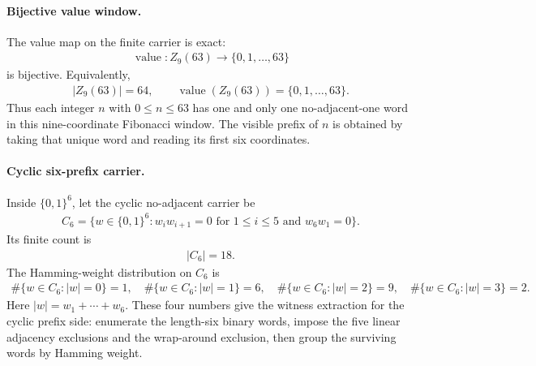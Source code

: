 \paragraph{Bijective value window.}
The value map on the finite carrier is exact:
$$
\begin{aligned}
\operatorname{value}:Z_9(63)\longrightarrow \{0,1,\ldots,63\}
\end{aligned}
$$
is bijective. Equivalently,
$$
\begin{aligned}
|Z_9(63)|=64,\qquad \operatorname{value}(Z_9(63))=\{0,1,\ldots,63\}.
\end{aligned}
$$
Thus each integer $n$ with $0\leq n\leq 63$ has one and only one no-adjacent-one word in this nine-coordinate Fibonacci window. The visible prefix of $n$ is obtained by taking that unique word and reading its first six coordinates.

\paragraph{Cyclic six-prefix carrier.}
Inside $\{0,1\}^6$, let the cyclic no-adjacent carrier be
$$
\begin{aligned}
C_6=\{w\in\{0,1\}^6 : w_iw_{i+1}=0 \text{ for } 1\leq i\leq 5 \text{ and } w_6w_1=0\}.
\end{aligned}
$$
Its finite count is
$$
\begin{aligned}
|C_6|=18.
\end{aligned}
$$
The Hamming-weight distribution on $C_6$ is
$$
\begin{aligned}
\#\{w\in C_6: |w|=0\}=1,\quad
\#\{w\in C_6: |w|=1\}=6,\quad
\#\{w\in C_6: |w|=2\}=9,\quad
\#\{w\in C_6: |w|=3\}=2.
\end{aligned}
$$
Here $|w|=w_1+\cdots+w_6$. These four numbers give the witness extraction for the cyclic prefix side: enumerate the length-six binary words, impose the five linear adjacency exclusions and the wrap-around exclusion, then group the surviving words by Hamming weight.

